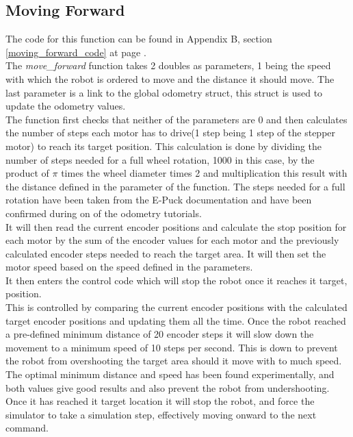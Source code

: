 \begin{flushleft}
\subsection{Moving Forward}
\label{moving_forward_description}
The code for this function can be found in Appendix B, section \ref{moving_forward_code} at page \pageref{moving_forward_code}.\\
The \textit{move\_forward }function takes 2 doubles as parameters, 1 being the speed with which the robot is ordered to move and the distance it should move. The last parameter is a link to the global odometry struct, this struct is used to update the odometry values.\\
The function first checks that neither of the parameters are 0 and then calculates the number of steps each motor has to drive(1 step being 1 step of the stepper motor) to reach its target position.
This calculation is done by dividing the number of steps needed for a full wheel rotation, 1000 in this case, by the product of $\pi$ times the wheel diameter times 2 and multiplication this result with the distance defined in the parameter of the function. The steps needed for a full rotation have been taken from the E-Puck documentation and have been confirmed during on of the odometry tutorials. \\
It will then read the current encoder positions and calculate the stop position for each motor by the sum of the encoder values for each motor and the previously calculated encoder steps needed to reach the target area. 
It will then set the motor speed based on the speed defined in the parameters.\\[3ex]

It then enters the control code which will stop the robot once it reaches it target, position. \\
This is controlled by comparing the current encoder positions with the calculated target encoder positions and updating them all the time. 
Once the robot reached a pre-defined minimum distance of 20 encoder steps it will slow down the movement to a minimum speed of 10 steps per second. This is down to prevent the robot from overshooting the target area should it move with to much speed. The optimal minimum distance and speed has been found experimentally, and both values give good results and also prevent the robot from undershooting.
Once it has reached it target location it will stop the robot, and force the simulator to take a simulation step, effectively moving onward to the next command.\\[3ex]


\end{flushleft}

